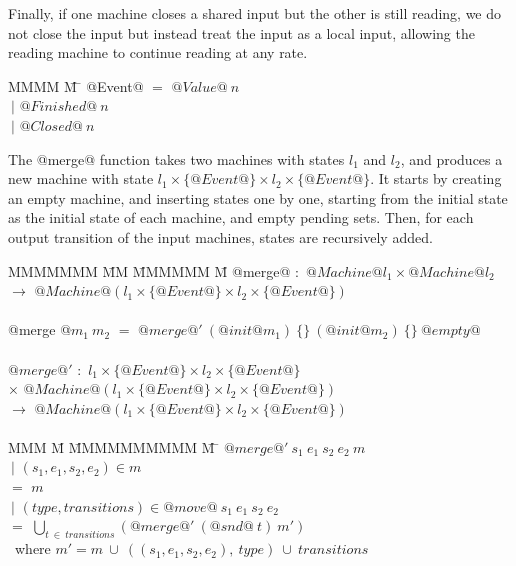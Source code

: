 Finally, if one machine closes a shared input but the other is still reading, we do not close the input but instead treat the input as a local input, allowing the reading machine to continue reading at any rate. 

\begin{tabbing}
MMMM \= M \= \kill
@Event@ \> $=$  \> $@Value@~n$ \\
       \> $~|$ \> $@Finished@~n$ \\
       \> $~|$ \> $@Closed@~n$ \\
\end{tabbing}

The @merge@ function takes two machines with states $l_1$ and $l_2$, and produces a new machine with state $l_1 \times \{@Event@\} \times l_2 \times \{@Event@\}$.
It starts by creating an empty machine, and inserting states one by one, starting from the initial state as the initial state of each machine, and empty pending sets.
Then, for each output transition of the input machines, states are recursively added.

\begin{tabbing}
MMMMMMM \= MM \= MMMMMM \= M\kill
@merge@ \> $:$ \> $@Machine @l_1 \times @Machine @l_2$ \\
        \> $\to$ \> $@Machine @(l_1 \times \{@Event@\} \times l_2 \times \{@Event@\})$ \\
\\
@merge @$m_1~m_2$ \> $=$ \> $@merge@'~(@init @m_1)~\{\}~(@init @m_2)~\{\}~@empty@$ \\
\\
$@merge@'$ \> $:$ \> $l_1 \times \{@Event@\} \times l_2 \times \{@Event@\}$               \\
           \> $\times$ \> $@Machine @(l_1 \times \{@Event@\} \times l_2 \times \{@Event@\})$ \\
           \> $\to$ \> $@Machine @(l_1 \times \{@Event@\} \times l_2 \times \{@Event@\})$ \\
\\
MMM \= M \= MMMMMMMMMM \= M \=\kill
$@merge@'~s_1~e_1~s_2~e_2~m$ \\
 \> $~|$ \> $(s_1, e_1, s_2, e_2) \in m$  \\
 \> $=$  \> $m$ \\
 \> $~|$ \> $(\mathit{type},\mathit{transitions}) \in @move@~s_1~e_1~s_2~e_2$ \\
 \> $=$  \> $\bigcup_{t~\in~\mathit{transitions}}(@merge@'~(@snd@~t)~m')$\\
~where  \> $m' = m~\cup~((s_1,e_1,s_2,e_2),~\mathit{type})~\cup~\mathit{transitions}$ \\
\end{tabbing}

